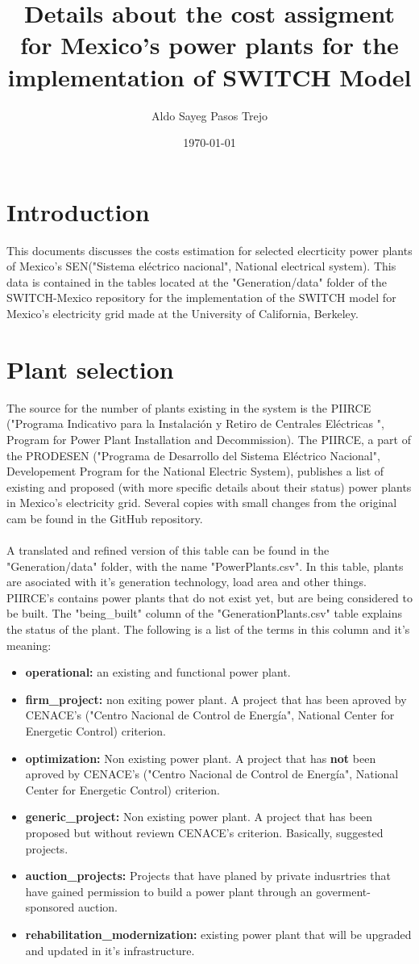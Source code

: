 \documentclass[letterpaper,12pt]{article}
\title{Details about the cost assigment for Mexico's power plants for the implementation of SWITCH Model}
\author[1,2]{Aldo Sayeg Pasos Trejo}
\affil[1]{\textit{Physics Departament. Facultad de Ciencias. Universidad Nacional Autonoma de Mexico}}
\affil[2]{\textit{Visiting Student Researcher for the Berkeley Energy and Climate Institute at University of California, Berkeley}}
\date{\today}
\begin{document}
\maketitle
\section{Introduction}
This documents discusses the costs estimation for selected elecrticity power plants of Mexico's SEN("Sistema eléctrico nacional", National electrical system). This data is contained in the tables located at the "Generation/data" folder of the SWITCH-Mexico repository\cite{repo} for the implementation of the SWITCH model for Mexico's electricity grid made at the University of California, Berkeley.
\section{Plant selection}
The source for the number of plants existing in the system is the PIIRCE ("Programa Indicativo para la Instalación y Retiro de Centrales Eléctricas ", Program for Power Plant Installation and Decommission). The PIIRCE, a part of the PRODESEN ("Programa de Desarrollo del Sistema Eléctrico Nacional", Developement Program for the National Electric System), publishes a list\cite{piirce} of existing and proposed (with more specific details about their status) power plants in Mexico's electricity grid. Several copies with small changes from the original cam be found in the GitHub repository.
\\
\\ A translated and refined version of this table can be found in the "Generation/data" folder, with the name "PowerPlants.csv". In this table, plants are asociated with it's generation technology, load area and other things. PIIRCE's contains power plants that do not exist yet, but are being considered to be built. The "being\_built" column of the "GenerationPlants.csv" table explains the status of the plant. The following is a list of the terms in this column and it's meaning:
\begin{itemize}
\item \textbf{operational: } an existing and functional power plant.
\item \textbf{firm\_project:} non exiting power plant. A project that has been aproved by CENACE's ("Centro Nacional de Control de Energía", National Center for Energetic Control) criterion.
\item \textbf{optimization:} Non existing power plant. A project that has \textbf{not} been aproved by CENACE's ("Centro Nacional de Control de Energía", National Center for Energetic Control) criterion.
\item \textbf{generic\_project:} Non existing power plant. A project that has been proposed but without reviewn CENACE's criterion. Basically, suggested projects.
\item \textbf{auction\_projects:} Projects that have planed by private indusrtries that have gained permission to build a power plant through an goverment-sponsored auction.
\item \textbf{rehabilitation\_modernization:} existing power plant that will be upgraded and updated in it's infrastructure.
\end{itemize}
\end{document}
